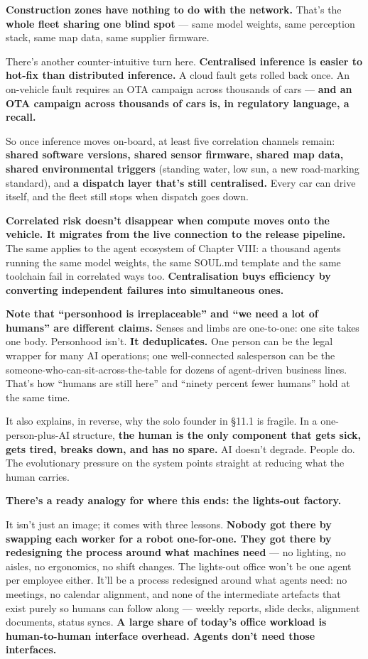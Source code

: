 \documentclass[11pt,a4paper]{article}
\begin{document}
\textbf{Construction zones have nothing to do with the network.} That's the \textbf{whole fleet sharing one blind spot} --- same model weights, same perception stack, same map data, same supplier firmware.

There's another counter-intuitive turn here. \textbf{Centralised inference is easier to hot-fix than distributed inference.} A cloud fault gets rolled back once. An on-vehicle fault requires an OTA campaign across thousands of cars --- \textbf{and an OTA campaign across thousands of cars is, in regulatory language, a recall.}

So once inference moves on-board, at least five correlation channels remain: \textbf{shared software versions, shared sensor firmware, shared map data, shared environmental triggers} (standing water, low sun, a new road-marking standard), and \textbf{a dispatch layer that's still centralised.} Every car can drive itself, and the fleet still stops when dispatch goes down.

\textbf{Correlated risk doesn't disappear when compute moves onto the vehicle. It migrates from the live connection to the release pipeline.} The same applies to the agent ecosystem of Chapter VIII: a thousand agents running the same model weights, the same SOUL.md template and the same toolchain fail in correlated ways too. \textbf{Centralisation buys efficiency by converting independent failures into simultaneous ones.}

\textbf{Note that ``personhood is irreplaceable'' and ``we need a lot of humans'' are different claims.} Senses and limbs are one-to-one: one site takes one body. Personhood isn't. \textbf{It deduplicates.} One person can be the legal wrapper for many AI operations; one well-connected salesperson can be the someone-who-can-sit-across-the-table for dozens of agent-driven business lines. That's how ``humans are still here'' and ``ninety percent fewer humans'' hold at the same time.

It also explains, in reverse, why the solo founder in \S{}11.1 is fragile. In a one-person-plus-AI structure, \textbf{the human is the only component that gets sick, gets tired, breaks down, and has no spare.} AI doesn't degrade. People do. The evolutionary pressure on the system points straight at reducing what the human carries.

\textbf{There's a ready analogy for where this ends: the lights-out factory.}

It isn't just an image; it comes with three lessons. \textbf{Nobody got there by swapping each worker for a robot one-for-one. They got there by redesigning the process around what machines need} --- no lighting, no aisles, no ergonomics, no shift changes. The lights-out office won't be one agent per employee either. It'll be a process redesigned around what agents need: no meetings, no calendar alignment, and none of the intermediate artefacts that exist purely so humans can follow along --- weekly reports, slide decks, alignment documents, status syncs. \textbf{A large share of today's office workload is human-to-human interface overhead. Agents don't need those interfaces.}
\end{document}
